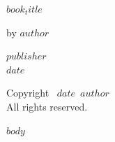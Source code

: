 \documentclass[12pt]{memoir}
\def\booktitle{$book_title$}
\def\bookauthor{$author$}
\def\bookdate{$date$}
\def\bookpublisher{$publisher$}
\begin{document}
\thispagestyle{empty}
\begin{center}
\vspace*{1.5in}
{\Huge\bfseries\booktitle\par}
\vspace{1in}
{\Large by \bookauthor\par}
\vfill
{\large\bookpublisher}\\
{\bookdate}
\end{center}

\clearpage
\thispagestyle{empty}
\vspace*{\fill}
\begin{center}
Copyright \textcopyright\ \bookdate\ \bookauthor\\
All rights reserved.
\end{center}
\vspace*{\fill}

\clearpage
\tableofcontents

$body$
\end{document}
